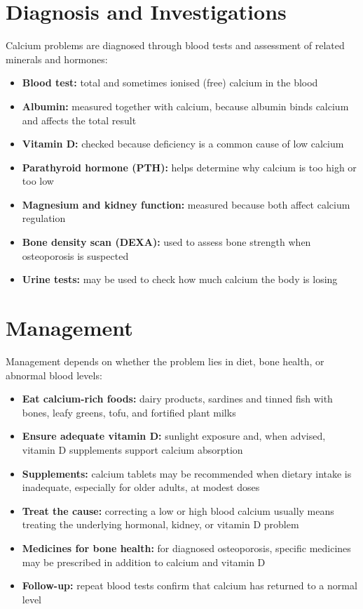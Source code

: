\section*{Diagnosis and Investigations}
Calcium problems are diagnosed through blood tests and assessment of related minerals and hormones:
\begin{itemize}
    \item \textbf{Blood test:} total and sometimes ionised (free) calcium in the blood
    \item \textbf{Albumin:} measured together with calcium, because albumin binds calcium and affects the total result
    \item \textbf{Vitamin D:} checked because deficiency is a common cause of low calcium
    \item \textbf{Parathyroid hormone (PTH):} helps determine why calcium is too high or too low
    \item \textbf{Magnesium and kidney function:} measured because both affect calcium regulation
    \item \textbf{Bone density scan (DEXA):} used to assess bone strength when osteoporosis is suspected
    \item \textbf{Urine tests:} may be used to check how much calcium the body is losing
\end{itemize}

\section*{Management}
Management depends on whether the problem lies in diet, bone health, or abnormal blood levels:
\begin{itemize}
    \item \textbf{Eat calcium-rich foods:} dairy products, sardines and tinned fish with bones, leafy greens, tofu, and fortified plant milks
    \item \textbf{Ensure adequate vitamin D:} sunlight exposure and, when advised, vitamin D supplements support calcium absorption
    \item \textbf{Supplements:} calcium tablets may be recommended when dietary intake is inadequate, especially for older adults, at modest doses
    \item \textbf{Treat the cause:} correcting a low or high blood calcium usually means treating the underlying hormonal, kidney, or vitamin D problem
    \item \textbf{Medicines for bone health:} for diagnosed osteoporosis, specific medicines may be prescribed in addition to calcium and vitamin D
    \item \textbf{Follow-up:} repeat blood tests confirm that calcium has returned to a normal level
\end{itemize}

